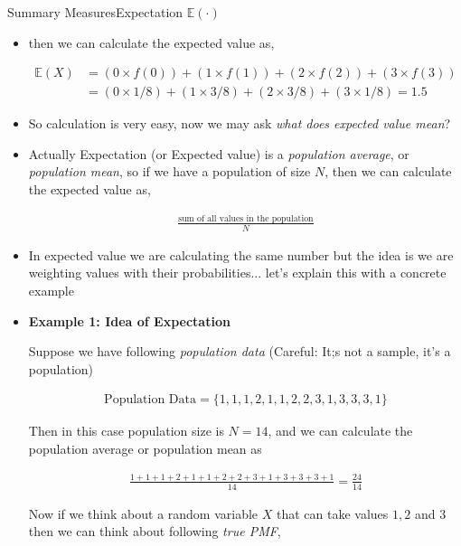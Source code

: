 \documentclass[8pt, usepdftitle = false]{beamer}
\begin{document}
\begin{frame}[allowframebreaks]{Summary Measures}{Expectation $\mathbb{E}(\cdot)$}
\begin{itemize}
\item then we can calculate the expected value as,

\begin{align*}
\mathbb{E}(X) &= \left(0 \times f(0)\right) + \left(1 \times f(1)\right) + \left(2 \times f(2)\right) + \left(3 \times f(3)\right) \\
&=\left(0 \times 1/8\right) + \left(1 \times 3/8\right) + \left(2 \times 3/8\right) + \left(3 \times 1/8\right) = 1.5
\end{align*}

\item So calculation is very easy, now we may ask \emph{what does expected value mean}?


\framebreak

\item Actually Expectation (or Expected value) is a \emph{population average}, or \emph{population mean}, so if we have a population of size $N$, then we can calculate the expected value as,

\begin{align*}
	\frac{\text{sum of all values in the population}}{N}
\end{align*}

\item In expected value we are calculating the same number but the idea is we are \alert{weighting values with their probabilities}... let's explain this with a concrete example


\framebreak

\item \textbf{Example 1: Idea of Expectation }

Suppose we have following \emph{population data} (Careful: It;s not a sample, it's a population) 

\begin{align*}
	\text{Population Data} = \{1, 1, 1, 2, 1, 1, 2, 2, 3, 1, 3, 3, 3, 1\}
\end{align*}

Then in this case population size is $N = 14$, and we can calculate the population average or population mean as

\begin{align*}
	\frac{1 + 1 + 1 + 2 + 1 + 1 + 2 + 2 + 3 + 1 + 3 + 3 + 3 + 1}{14} = \frac{24}{14}  
\end{align*}

Now if we think about a random variable $X$ that can take values $1, 2$ and $3$ then we can think about following \emph{true PMF},


\end{itemize}
\end{frame}
\end{document}
